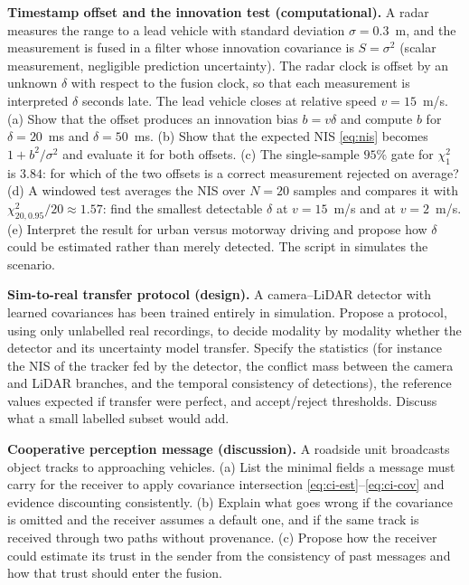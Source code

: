 \begin{prob}\label{prob:ch08:3}
\textbf{Timestamp offset and the innovation test (computational).} A radar measures the range to a lead vehicle with standard deviation $\sigma=0.3$~m, and the measurement is fused in a filter whose innovation covariance is $S=\sigma^2$ (scalar measurement, negligible prediction uncertainty). The radar clock is offset by an unknown $\delta$ with respect to the fusion clock, so that each measurement is interpreted $\delta$ seconds late. The lead vehicle closes at relative speed $v=15$~m/s. (a) Show that the offset produces an innovation bias $b=v\delta$ and compute $b$ for $\delta=20$~ms and $\delta=50$~ms. (b) Show that the expected NIS \eqref{eq:nis} becomes $1+b^2/\sigma^2$ and evaluate it for both offsets. (c) The single-sample $95\%$ gate for $\chi^2_1$ is $3.84$: for which of the two offsets is a correct measurement rejected on average? (d) A windowed test averages the NIS over $N=20$ samples and compares it with $\chi^2_{20,0.95}/20\approx1.57$: find the smallest detectable $\delta$ at $v=15$~m/s and at $v=2$~m/s. (e) Interpret the result for urban versus motorway driving and propose how $\delta$ could be estimated rather than merely detected. The script  in  simulates the scenario.
\end{prob}

\begin{prob}\label{prob:ch08:4}
\textbf{Sim-to-real transfer protocol (design).} A camera--LiDAR detector with learned covariances has been trained entirely in simulation. Propose a protocol, using only unlabelled real recordings, to decide modality by modality whether the detector and its uncertainty model transfer. Specify the statistics (for instance the NIS of the tracker fed by the detector, the conflict mass between the camera and LiDAR branches, and the temporal consistency of detections), the reference values expected if transfer were perfect, and accept/reject thresholds. Discuss what a small labelled subset would add.
\end{prob}

\begin{prob}\label{prob:ch08:5}
\textbf{Cooperative perception message (discussion).} A roadside unit broadcasts object tracks to approaching vehicles. (a) List the minimal fields a message must carry for the receiver to apply covariance intersection \eqref{eq:ci-est}--\eqref{eq:ci-cov} and evidence discounting consistently. (b) Explain what goes wrong if the covariance is omitted and the receiver assumes a default one, and if the same track is received through two paths without provenance. (c) Propose how the receiver could estimate its trust in the sender from the consistency of past messages and how that trust should enter the fusion.
\end{prob}

